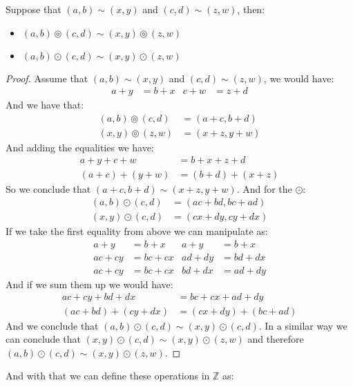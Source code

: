 \documentclass{tufte-handout}
\begin{document}
\begin{theorem}
	Suppose that $(a, b) \sim (x, y)$ and $(c, d) \sim (z, w)$, then:
	\begin{itemize}
		\item $(a, b) \circledcirc (c, d) \sim (x, y) \circledcirc (z, w)$
		\item $(a, b) \odot (c, d) \sim (x, y) \odot (z, w)$
	\end{itemize}
\end{theorem}
\begin{proof}
	Assume that $(a, b) \sim (x, y)$ and $(c, d) \sim (z, w)$, we would have:
	\begin{align*}
		a + y &= b + x & c + w &= z + d
	\end{align*}
	And we have that:
	\begin{align*}
		(a, b) \circledcirc (c, d) &= (a + c, b + d)\\
		(x, y) \circledcirc (z, w) &= (x + z, y + w)
	\end{align*}
	And adding the equalities we have:
	\begin{align*}
		a + y + c + w &= b + x + z + d\\
		(a + c) + (y + w) &= (b + d) + (x + z)
	\end{align*}
	So we conclude that $(a + c, b + d) \sim (x + z, y + w)$. And for the $\odot$:
	\begin{align*}
		(a, b) \odot (c, d) &= (ac+bd, bc+ad)\\
		(x, y) \odot (c, d) &= (cx+dy, cy + dx)
	\end{align*}
	If we take the first equality from above we can manipulate as:
	\begin{align*}
		a + y &= b + x & a + y &= b + x\\
		ac + cy &= bc + cx & ad + dy &= bd + dx\\
		ac + cy &= bc + cx & bd + dx &= ad + dy
	\end{align*}
	And if we sum them up we would have:
	\begin{align*}
		ac + cy + bd + dx &= bc + cx + ad + dy\\
		(ac+bd) + (cy+dx) &= (cx+dy) + (bc + ad)
	\end{align*}
	And we conclude that $(a, b) \odot (c, d) \sim (x, y) \odot (c, d)$. In a similar way we can conclude that $(x, y) \odot (c, d) \sim (x, y) \odot (z, w)$ and therefore $(a, b) \odot (c, d) \sim (x, y) \odot (z, w)$.
\end{proof}

And with that we can define these operations in $\mathbb{Z}$ as:
\end{document}
